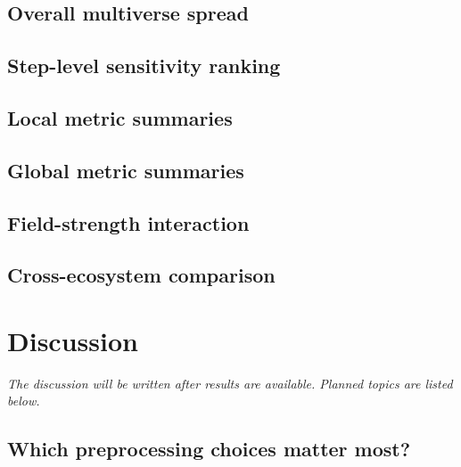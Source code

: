 \documentclass[11pt,a4paper]{article}
\begin{document}
\subsection{Overall multiverse spread}

\subsection{Step-level sensitivity ranking}

\subsection{Local metric summaries}

\subsection{Global metric summaries}

\subsection{Field-strength interaction}

\subsection{Cross-ecosystem comparison}

\section{Discussion}

\textit{The discussion will be written after results are available.  Planned topics are listed below.}

\subsection{Which preprocessing choices matter most?}
\end{document}
